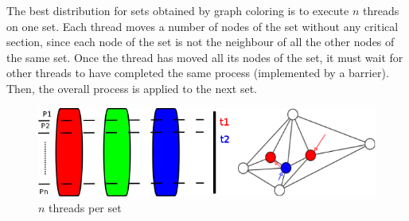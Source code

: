 The best distribution for sets obtained by graph coloring is to execute $n$ threads on one set. Each thread moves a number of nodes of the set without any critical section, since each node of the set is not the neighbour of all the other nodes of the same set. Once the thread has moved all its nodes of the set, it must wait for other threads to have completed the same process (implemented by a barrier). Then, the overall process is applied to the next set.

\begin{figure}[!h]
\centering
\includegraphics[scale=0.5]{img/distrib.png}
\caption{$n$ threads per set}
\end{figure}



